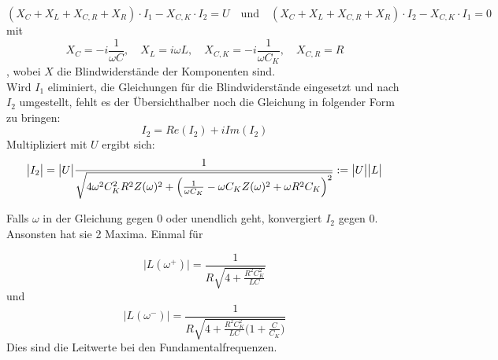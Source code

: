 \begin{equation}
(X_C + X_L + X_{C,R} + X_R)\cdot I_1 - X_{C,K}\cdot I_2 = U
\quad\textrm{und}\quad
(X_C + X_L + X_{C,R} + X_R)\cdot I_2 - X_{C,K}\cdot I_1 = 0
\end{equation}
mit
\begin{equation}
X_C = -i\frac{1}{\omega C},\quad X_L = i\omega L,\quad X_{C,K} = -i\frac{1}{\omega C_K},\quad X_{C,R}=R
\end{equation}
, wobei \(X\) die Blindwiderstände der Komponenten sind.\\
Wird \(I_1\) eliminiert, die Gleichungen für die Blindwiderstände eingesetzt und nach \(I_2\) umgestellt, fehlt es der Übersichthalber noch die Gleichung in folgender Form zu bringen:
\begin{equation}
I_2 = \mathit{Re}(I_2)+i\mathit{Im}(I_2)  
\end{equation}
Multipliziert mit \(U\) ergibt sich:
\begin{equation}
    \bigl|I_2\bigr| = \bigl|U\bigr| \frac{1}{\sqrt{4\omega^2C_K^2R^2Z(\omega)^2+\Bigl(\frac{1}{\omega C_K}-\omega C_KZ(\omega)^2+\omega R^2C_K\Bigr)^2}} := \bigl|U\bigr| \bigl|L\bigr|
\end{equation}

Falls \(\omega\) in der Gleichung gegen 0 oder unendlich geht, konvergiert \(I_2\) gegen 0. Ansonsten hat sie 2 Maxima. Einmal für

\begin{equation}
   \bigl|L(\omega^+)\bigr| = \frac{1}{R\sqrt{4+\frac{R^2C_K^2}{LC}}}
   \label{eq:strom+}
\end{equation}
und
\begin{equation}
    \bigl|L(\omega^-)\bigr| = \frac{1}{R\sqrt{4+\frac{R^2C_K^2}{LC}\biggl(1+\frac{C}{C_K}\biggr)}}
    \label{eq:strom-}
\end{equation}
Dies sind die Leitwerte bei den Fundamentalfrequenzen.